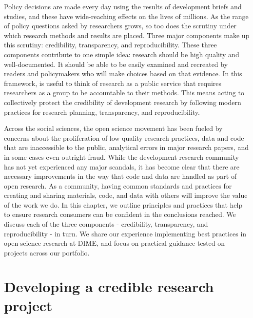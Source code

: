 
\begin{fullwidth}

	Policy decisions are made every day using the results of development briefs and studies,
	and these have wide-reaching effects on the lives of millions.
	As the range of policy questions asked by researchers grows,
	so too does the scrutiny under which research methods and results are placed.
  Three major components make up this scrutiny:
  credibility, transparency, and reproducibility.
  These three components contribute to one simple idea:
  research should be high quality and well-documented.
  It should be able to be easily examined and recreated by readers
  and policymakers who will make choices based on that evidence.
	In this framework, is useful to think of research as a public service
  that requires researchers as a group to be accountable to their methods.
	This means acting to collectively protect the credibility of development research
	by following modern practices for research planning, transparency, and reproducibility.

  Across the social sciences, the open science movement has been fueled
  by concerns about the proliferation of low-quality research practices,
	data and code that are inaccessible to the public,
  analytical errors in major research papers,
	and in some cases even outright fraud.
  While the development research community has not yet
  experienced any major scandals,
  it has become clear that there are necessary improvements
	in the way that code and data are handled as part of open research.
  As a community, having common standards and practices
  for creating and sharing materials, code, and data with others
  will improve the value of the work we do.
	In this chapter, we outline principles and practices that help to ensure
	research consumers can be confident in the conclusions reached. 
We discuss each of the three components - credibility, transparency, and reproducibility - in turn.
  We share our experience implementing best practices in open science research at DIME,
  and focus on practical guidance tested on projects across our portfolio.


\end{fullwidth}


\section{Developing a credible research project}

